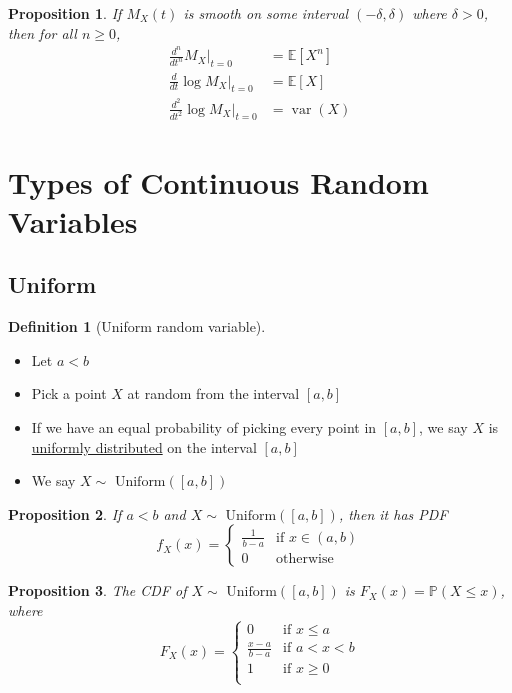 \documentclass[
]{article}
\newtheorem{proposition}{Proposition}[section]
\theoremstyle{definition}
\newtheorem{definition}{Definition}[section]
\theoremstyle{definition}
\theoremstyle{definition}
\theoremstyle{remark}
\newcommand{\prob}[1]{\mathbb{P}\left(#1\right)}
\newcommand{\fxx}{f_X(x)}
\newcommand{\Fxx}{F_X(x)}
\newcommand{\mx}[1]{M_X(#1)}
\newcommand{\E}[1]{\mathbb{E}[#1]}
\newcommand{\varx}{\operatorname{var}(X)}
\newcommand{\unif}[1]{\sim\text{ Uniform}\left(\left[ #1 \right]\right)}
\begin{document}
\begin{proposition}
  If $\mx{t}$ is smooth on some interval $(-\delta,\delta)$ where $\delta>0$, then for all $n\geq 0$,
  \begin{align*}
    \frac{d^n}{dt^n}M_X\big|_{t=0}      & =\E{X^n} \\
    \frac{d}{dt}\log M_X\big|_{t=0}     & =\E{X}   \\
    \frac{d^2}{dt^2}\log M_X\big|_{t=0} & =\varx
  \end{align*}
\end{proposition}

\section{Types of Continuous Random Variables}

\subsection{Uniform}

\begin{definition}
  [Uniform random variable]
  \begin{itemize}
    \item Let $a<b$
    \item Pick a point $X$ at random from the interval $[a,b]$
    \item If we have an equal probability of picking every point in $[a,b]$, we say $X$ is \underline{uniformly distributed} on the interval $[a,b]$
    \item We say $X\unif{a,b}$
  \end{itemize}
\end{definition}

\begin{proposition}
  If $a<b$ and $X\unif{a,b}$, then it has PDF
  \[\fxx=\begin{cases}
      \frac{1}{b-a} & \text{if }x\in(a,b) \\
      0             & \text{otherwise}
    \end{cases}\]
\end{proposition}

\begin{proposition}
  The CDF of $X\unif{a,b}$ is $\Fxx=\prob{X\leq x}$, where
  \[\Fxx=\begin{cases}
      0               & \text{if }x\leq a \\
      \frac{x-a}{b-a} & \text{if }a<x<b   \\
      1               & \text{if }x\geq 0 \\
    \end{cases}\]
\end{proposition}
\end{document}
